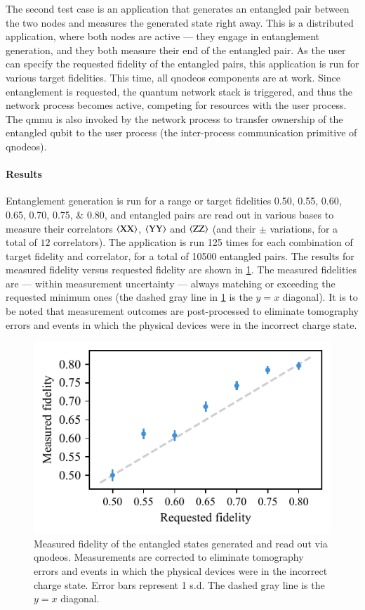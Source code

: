 The second test case is an application that generates an entangled pair between the two nodes and
measures the generated state right away. This is a distributed application, where both nodes are
active --- they engage in entanglement generation, and they both measure their end of the entangled
pair. As the user can specify the requested fidelity of the entangled pairs, this application is run
for various target fidelities. This time, all \acrshort{qnodeos} components are at work. Since
entanglement is requested, the quantum network stack is triggered, and thus the network process
becomes active, competing for resources with the user process. The \acrshort{qmmu} is also invoked
by the network process to transfer ownership of the entangled qubit to the user process (the
inter-process communication primitive of \acrshort{qnodeos}).

\paragraph{Results}

Entanglement generation is run for a range or target fidelities \numlist{0.50; 0.55; 0.60; 0.65;
0.70; 0.75; 0.80}, and entangled pairs are read out in various bases to measure their correlators
$\braket{\mathrm{XX}}$, $\braket{\mathrm{YY}}$ and $\braket{\mathrm{ZZ}}$ (and their $\pm$
variations, for a total of $12$ correlators). The application is run \num{125} times for each
combination of target fidelity and correlator, for a total of \num{10500} entangled pairs. The
results for measured fidelity versus requested fidelity are shown in \cref{fig:ent-gen}. The
measured fidelities are --- within measurement uncertainty --- always matching or exceeding the
requested minimum ones (the dashed gray line in \cref{fig:ent-gen} is the $y=x$ diagonal). It is to
be noted that measurement outcomes are post-processed to eliminate tomography errors and events in
which the physical devices were in the incorrect charge state.

\begin{figure}[t]
    \centering
    \includegraphics[width=0.6\linewidth]{figures/ent-gen.pdf}
    \caption{
        Measured fidelity of the entangled states generated and read out via \acrshort{qnodeos}.
        Measurements are corrected to eliminate tomography errors and events in which the physical
        devices were in the incorrect charge state. Error bars represent 1 s.d. The dashed gray line
        is the $y=x$ diagonal.
    }
    \label{fig:ent-gen}
\end{figure}

